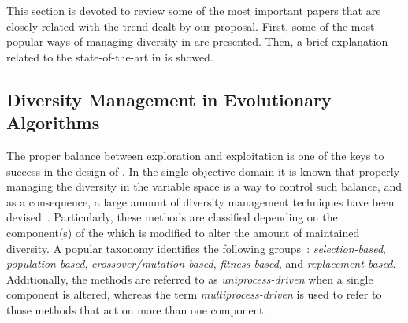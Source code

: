 This section is devoted to review some of the most important papers that are closely related with the trend dealt by our proposal.
%
First, some of the most popular ways of managing diversity in \EAS{} are presented.
%
Then, a brief explanation related to the state-of-the-art in \MOEAS{} is showed.

\subsection{Diversity Management in Evolutionary Algorithms}

The proper balance between exploration and exploitation is one of the keys to success in the design of \EAS{}.
%
In the single-objective domain it is known that properly managing the diversity in the variable space is a way to control such balance,
and as a consequence, a large amount of diversity management techniques have been devised~\cite{Mohan:14}.
%
Particularly, these methods are classified depending on the component(s) of the \EA{} which is modified to alter the 
amount of maintained diversity.
%
A popular taxonomy identifies the following groups~\cite{Joel:Crepinsek}: \textit{selection-based}, \textit{population-based}, 
\textit{crossover/mutation-based}, \textit{fitness-based}, and \textit{replacement-based}.
%
Additionally, the methods are referred to as \textit{uniprocess-driven} when a single component is altered, whereas the term
\textit{multiprocess-driven} is used to refer to those methods that act on more than one component.

